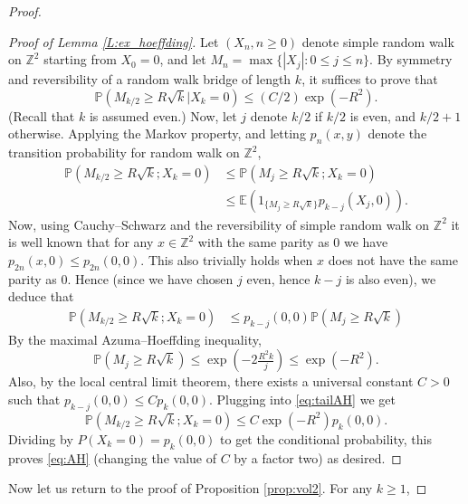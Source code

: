 \documentclass[10pt,a4paper]{amsart}
\begin{document}
\begin{proof}
\begin{proof}[Proof of Lemma \ref{L:ex_hoeffding}]
    Let $(X_n, n\ge 0)$ denote simple random walk on $\mathbb{Z}^2$ starting from $X_0 = 0$, and let $M_n = 
    \max \{|X_j|:0
    \le j \le n \}$.  
    By symmetry and reversibility of a random walk bridge of length $k$, it suffices to prove that 
    \begin{equation}\label{eq:AH}
    \mathbb{P}( M_{k/2} \geq R \sqrt{k} | X_k = 0) \leq (C/2) \exp(-R^2).
    \end{equation}
    (Recall that $k$ is assumed even.) 
    Now, let $j$ denote $k/2$ if $k/2$ is even, and $k/2+1$ otherwise. 
    Applying the Markov property, and letting $p_n(x,y)$ denote the transition probability for random walk on $\mathbb{Z}^2$, 
    \begin{align*}
    \mathbb{P}( M_{k/2} \geq R \sqrt{k} ; X_k = 0) 
    &\le \mathbb{P}( M_j 
    \geq  R \sqrt{k} ; X_k = 0) \\
    & \leq \mathbb{E}( 1_{
    \{M_{j} \ge R\sqrt{k}\}} p_{k-j}(X_j,0))  .
    \end{align*}
    Now, using Cauchy--Schwarz and the reversibility of simple random walk on $
    \mathbb{Z}^2$ it is well known that for any $x\in \mathbb{Z}^2$ with the same parity as 0 we have $p_{2n}(x,0) \le p_{2n} (0,0)$. This also trivially holds when $x$ does not have the same parity as 0. Hence (since we have chosen $j$ even, hence $k-j$ is also even), we deduce that 
    \begin{align}\label{eq:tailAH}
    \mathbb{P}( M_{k/2} \geq R \sqrt{k} ; X_k = 0)  &\le p_{k-j} (0,0) \mathbb{P}( M_j 
    \geq  R \sqrt{k} )
    \end{align}
    By the maximal Azuma--Hoeffding inequality,
    $$
    \mathbb{P}( M_j 
    \geq  R \sqrt{k} )\le \exp ( - 2\tfrac{R^2k}{j}) \le \exp ( - R^2).
    $$
    Also, by the local central limit theorem, there exists a universal constant $C>0$ such that $p_{k-j}(0,0) \le C p_k(0,0)$. Plugging into \eqref{eq:tailAH} we get
    \[
    \mathbb{P}( M_{k/2} \geq R \sqrt{k} ; X_k = 0)  \le C \exp(-R^2) p_k(0,0).
    \]
    Dividing by $
    P(X_k =0) = p_k(0,0)$ to get the conditional probability, this proves \eqref{eq:AH} (changing the value of $C$ by a factor two) as desired. 
\end{proof}

    
    Now let us return to the proof of Proposition \ref{prop:vol2}.    For any $k\geq 1$, 
    

\end{proof}
\end{document}
